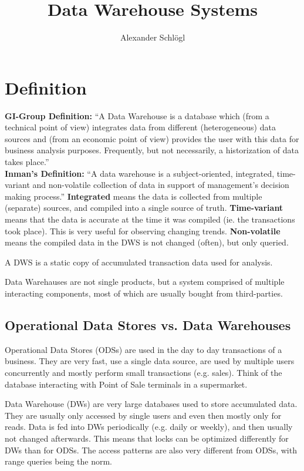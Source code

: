 \documentclass{article}
\title{Data Warehouse Systems}
\author{Alexander Schlögl}
\begin{document}
\maketitle
\section{Definition}
\textbf{GI-Group Definition:}
“A Data Warehouse is a database which (from a technical point of view) integrates data from different (heterogeneous) data sources and (from an economic point of view) provides the user with this data for business analysis purposes. Frequently, but not necessarily, a historization of data takes place.”
\\
\textbf{Inman's Definition:}
“A data warehouse is a subject-oriented, integrated, time-variant and non-volatile collection of data in support of management's decision making process.”
\textbf{Integrated} means the data is collected from multiple (separate) sources, and compiled into a single source of truth.
\textbf{Time-variant} means that the data is accurate at the time it was compiled (ie. the transactions took place).
This is very useful for observing changing trends.
\textbf{Non-volatile} means the compiled data in the DWS is not changed (often), but only queried.
\begin{keypointbox}
    A DWS is a static copy of accumulated transaction data used for analysis.
\end{keypointbox}

Data Warehauses are not single products, but a system comprised of multiple interacting components, most of which are usually bought from third-parties.

\subsection{Operational Data Stores vs. Data Warehouses}
Operational Data Stores (ODSs) are used in the day to day transactions of a business.
They are very fast, use a single data source, are used by multiple users concurrently and mostly perform small transactions (e.g. sales).
Think of the database interacting with Point of Sale terminals in a supermarket.

Data Warehouse (DWs) are very large databases used to store accumulated data.
They are usually only accessed by single users and even then mostly only for reads.
Data is fed into DWs periodically (e.g. daily or weekly), and then usually not changed afterwards.
This means that locks can be optimized differently for DWs than for ODSs.
The access patterns are also very different from ODSs, with range queries being the norm.
\end{document}
